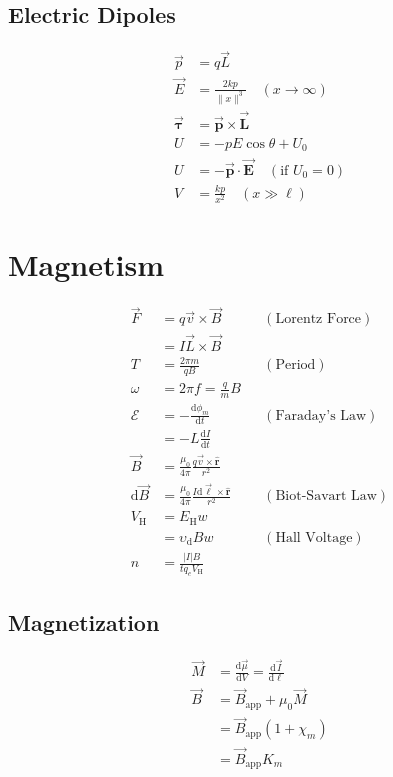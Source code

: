 \documentclass[10pt]{article}
\newcommand{\id}[1]{\mathrm{d} #1}
\newcommand{\bvec}[1]{\vec{\mathbf{#1}}}
\newcommand{\buvec}[1]{\hat{\mathbf{#1}}}
\begin{document}
\begin{multicols*}{5}
\subsection{Electric Dipoles}
\begin{align*}
    \vec{p} &= q\vec{L}\\
    \vec{E} &= \frac{2kp}{\|x\|^3} \quad (x \to \infty)\\
    \vec{\boldsymbol{\tau}} &= \bvec{p} \times \bvec{L}\\
    U &= -pE\cos \theta + U_0\\
    U &= -\bvec{p} \cdot \bvec{E} \quad (\text{if $U_0 = 0$})\\
    V &= \frac{kp}{x^2} \quad (x \gg \ell)
\end{align*}

\section{Magnetism}

\begin{align*}
    \vec{F} &= q\vec{v} \times \vec{B} && (\text{Lorentz Force})\\
      &= I\vec{L} \times \vec{B}\\
    T &= \frac{2\pi m}{qB} && (\text{Period})\\
    \omega &= 2\pi f = \frac{q}{m}B\\
    \mathcal{E} &= -\frac{\id{\phi_m}}{\id{t}} && (\text{Faraday's
	Law})\\
                &= -L \frac{\id{I}}{\id{t}}\\
    \vec{B} &= \frac{\mu_0}{4\pi} \frac{q\vec{v} \times \buvec{r}}
    {r^2}\\
    \id{\vec{B}} &= \frac{\mu_0}{4\pi} \frac{I\id{\vec{\ell}} \times
    \buvec{r}} {r^2} && (\text{Biot-Savart Law})\\
    V_\mathrm{H} &= E_\mathrm{H} w \\
    &= \upsilon_\mathrm{d}Bw && (\text{Hall Voltage})\\
    n &= \frac{|I|B}{tq_eV_\mathrm{H}}
\end{align*}

\subsection{Magnetization}

\begin{align*}
    \vec{M} &= \frac{\id{\vec{\mu}}}{\id V} =
    \frac{\id{\vec{I}}}{\id{\ell}}\\
    \vec{B} &= \vec{B}_\text{app} + \mu_0 \vec{M}\\
	    &= \vec{B}_\text{app} (1 + \chi_m)\\
	    &= \vec{B}_\text{app} K_m
\end{align*}


\end{multicols*}
\end{document}
